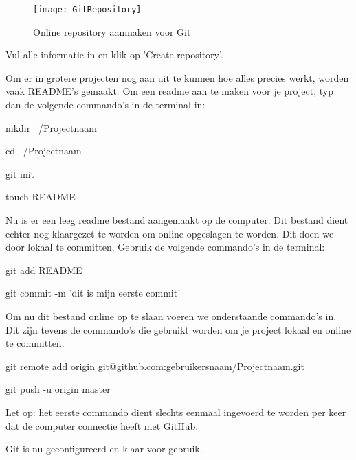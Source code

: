 \documentclass[12pt]{article}
\begin{document}
\begin{figure} [!ht]
\begin{center}
	\texttt{[image: GitRepository]}
\end{center}
	\caption{Online repository aanmaken voor Git}
\end{figure}

Vul alle informatie in en klik op 'Create repository'.

Om er in grotere projecten nog aan uit te kunnen hoe alles precies werkt, worden vaak README's gemaakt. Om een readme aan te maken voor je project, typ dan de volgende commando's in de terminal in:

mkdir ~/Projectnaam

cd ~/Projectnaam

git init

touch README

Nu is er een leeg readme bestand aangemaakt op de computer. Dit bestand dient echter nog klaargezet te worden om online opgeslagen te worden. Dit doen we door lokaal te committen. Gebruik de volgende commando's in de terminal:

git add README

git commit -m 'dit is mijn eerste commit'

Om nu dit bestand online op te slaan voeren we onderstaande commando's in. Dit zijn tevens de commando's die gebruikt worden om je project lokaal en online te committen.

git remote add origin git@github.com:gebruikersnaam/Projectnaam.git

git push -u origin master

Let op: het eerste commando dient slechts eenmaal ingevoerd te worden per keer dat de computer connectie heeft met GitHub.

Git is nu geconfigureerd en klaar voor gebruik.
\newpage
\nocite{*}


\end{document}
